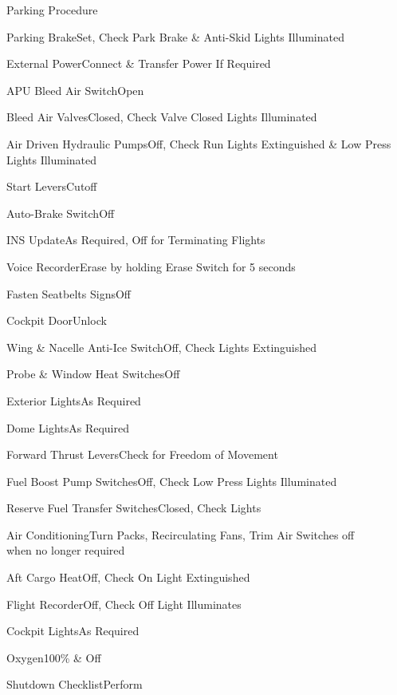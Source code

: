 \documentclass[sim-use, blue_items]{checklist}
\begin{document}
\begin{checklist}{Parking Procedure}
	\item{Parking Brake}{Set, Check Park Brake \& Anti-Skid Lights Illuminated}
	\item{External Power}{Connect \& Transfer Power If Required}
	\item{APU Bleed Air Switch}{Open}
	\item{Bleed Air Valves}{Closed, Check Valve Closed Lights Illuminated}
	\item{Air Driven Hydraulic Pumps}{Off, Check Run Lights Extinguished \& Low Press Lights Illuminated}
	\item{Start Levers}{Cutoff}
	\item{Auto-Brake Switch}{Off}
	\item{INS Update}{As Required, Off for Terminating Flights}
	\item{Voice Recorder}{Erase by holding Erase Switch for 5 seconds}
	\item{Fasten Seatbelts Signs}{Off}
	\item{Cockpit Door}{Unlock}
	\item{Wing \& Nacelle Anti-Ice Switch}{Off, Check Lights Extinguished}
	\item{Probe \& Window Heat Switches}{Off}
	\item{Exterior Lights}{As Required}
	\item{Dome Lights}{As Required}
	\item{Forward Thrust Levers}{Check for Freedom of Movement}
	\item{Fuel Boost Pump Switches}{Off, Check Low Press Lights Illuminated}
	\item{Reserve Fuel Transfer Switches}{Closed, Check Lights}
	\item{Air Conditioning}{Turn Packs, Recirculating Fans, Trim Air Switches off\\when no longer required}
	\item{Aft Cargo Heat}{Off, Check On Light Extinguished}
	\item{Flight Recorder}{Off, Check Off Light Illuminates}
	\item{Cockpit Lights}{As Required}
	\item{Oxygen}{100\% \& Off}
	\item{Shutdown Checklist}{Perform}
\end{checklist}
\end{document}
